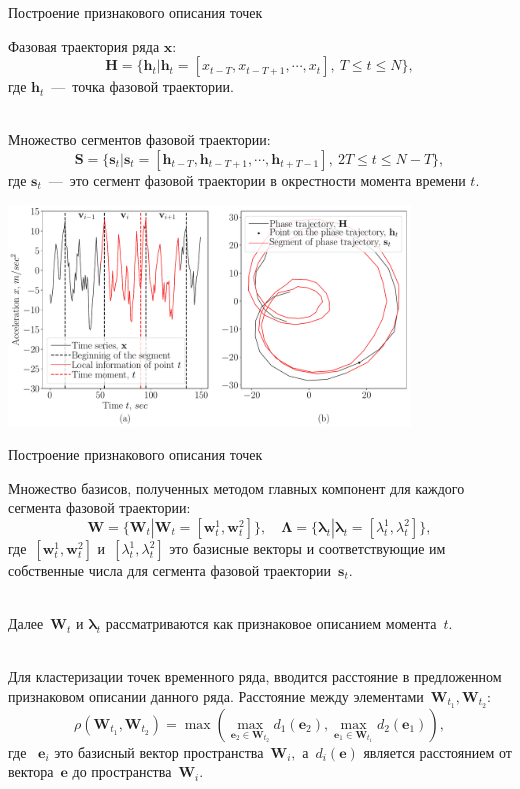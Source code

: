 \documentclass[9pt,pdf,hyperref={unicode}]{beamer}
\begin{document}
\begin{frame}[shrink=5]{Построение признакового описания точек}
\justifying

Фазовая траектория ряда $\textbf{x}$:
$$\mathbf{H} = \{\textbf{h}_t| \textbf{h}_t = [x_{t-T}, x_{t-T+1}, \cdots, x_{t}],~T\leq t\leq N\},$$
где $\textbf{h}_t$~---~точка фазовой траектории.

~\\
Множество сегментов фазовой траектории:
$$\mathbf{S} = \{\textbf{s}_t| \textbf{s}_t = [\textbf{h}_{t-T}, \textbf{h}_{t-T+1}, \cdots, \textbf{h}_{t+T-1}],~2T\leq t\leq N-T\},$$
где $\textbf{s}_t$~---~это сегмент фазовой траектории в окрестности момента времени $t$.

\begin{center}
	\includegraphics[width=0.8\textwidth]{results/statement}
\end{center}
\end{frame}
\begin{frame}{Построение признакового описания точек}
\justifying

Множество базисов, полученных методом главных компонент для каждого сегмента фазовой траектории:
$$\mathbf{W} = \{\textbf{W}_t| \textbf{W}_t = [\textbf{w}^1_t, \textbf{w}^2_t]\}, \quad \bm{\Lambda} = \{\bm{\lambda}_t| \bm{\lambda}_t=[\lambda^1_t, \lambda^2_t]\},$$
где~$[\textbf{w}^1_t, \textbf{w}^2_t]$ и~$[\lambda^1_t, \lambda^2_t]$ это базисные векторы и соответствующие им собственные числа для сегмента фазовой траектории~$\textbf{s}_t$. 

~\\
Далее~$\textbf{W}_t$  и $\bm{\lambda}_t$ рассматриваются как признаковое описанием момента~$t$.

~\\
Для кластеризации точек временного ряда, вводится расстояние в предложенном признаковом описании данного ряда. Расстояние между элементами~$\mathbf{W}_{t_1},\mathbf{W}_{t_2}$:\\
$$\rho\left(\textbf{W}_{t_1}, \textbf{W}_{t_2}\right) = \max\left(\max_{\textbf{e}_2 \in \textbf{W}_{t_2}} d_{1}\left(\textbf{e}_2\right), \max_{\textbf{e}_1 \in \textbf{W}_{t_1}} d_{2}\left(\textbf{e}_1\right)\right),$$
где ~$\textbf{e}_i$ это базисный вектор пространства~$\textbf{W}_i,$ а~$d_i\left(\textbf{e}\right)$ является расстоянием от вектора~$\textbf{e}$ до пространства~$\textbf{W}_i$.

\end{frame}
\end{document}
